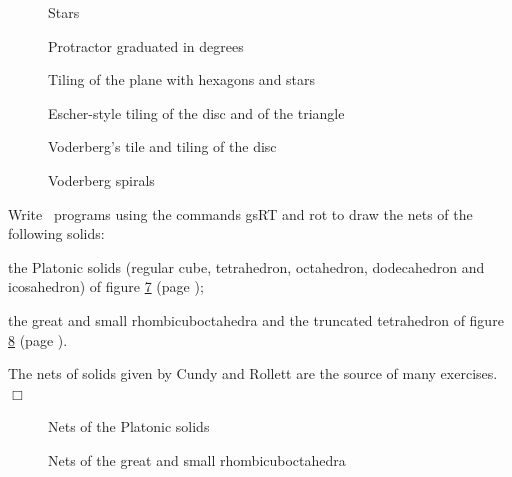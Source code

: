 \begin{figure}[htbp]
 \caption{Stars}\label{fig:etoiles}
\end{figure}
\begin{figure}[htbp]
 \caption{Protractor graduated in degrees}\label{fig:rapport}
\end{figure}
\begin{figure}[htbp]
 \caption{Tiling of the plane with hexagons and stars}\label{fig:pavhexeto}
\end{figure}
\begin{figure}[htbp]
 \caption{Escher-style tiling of the disc and of the triangle}\label{fig:pavdistri}
\end{figure}
\begin{figure}[htbp]
 \caption{Voderberg's tile and tiling of the disc}\label{fig:voder1}
\end{figure}
\begin{figure}[htbp]
 \caption{Voderberg spirals}\label{fig:voder2}
\end{figure}
\begin{exercices}{Write \python\ programs using the commands {\idt gsRT} and {\idt rot}
to draw the nets of the following solids:

\tiret the Platonic solids (regular cube, tetrahedron, octahedron, dodecahedron and
icosahedron) of figure \ref{fig:platon} (page \pageref{fig:platon});

\tiret the great and small rhombicuboctahedra and the truncated tetrahedron of figure
\ref{fig:devsol} (page \pageref{fig:devsol}).

The nets of solids given by Cundy and Rollett \cite{cundy}
are the source of many exercises.
\noindent $\Box$}\end{exercices}
\begin{figure}[htbp]
 \caption{Nets of the Platonic solids}
 \label{fig:platon}
\end{figure}
\begin{figure}[htbp]
\caption{Nets of the great and small rhombicuboctahedra}\label{fig:devsol}
\end{figure}


